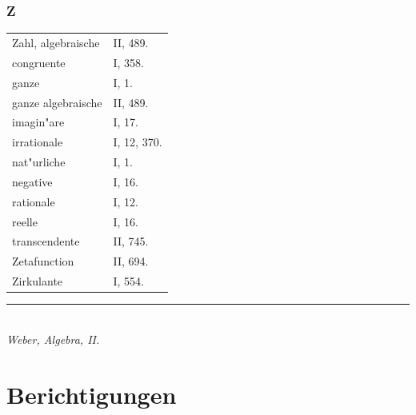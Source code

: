 \documentclass[10pt,a4paper]{article}
\theoremstyle{weberstyle}
\begin{document}
\section*{Z}
\begin{flushleft}
\begin{tabular}{@{}p{8cm}l@{}}
Zahl, algebraische & II, 489.\\
\quad congruente & I, 358.\\
\quad ganze & I, 1.\\
\quad ganze algebraische & II, 489.\\
\quad imagin"are & I, 17.\\
\quad irrationale & I, 12, 370.\\
\quad nat"urliche & I, 1.\\
\quad negative & I, 16.\\
\quad rationale & I, 12.\\
\quad reelle & I, 16.\\
\quad transcendente & II, 745.\\[4pt]
Zetafunction & II, 694.\\[4pt]
Zirkulante & I, 554.
\end{tabular}
\end{flushleft}

\vfill
\begin{center}
\rule{0.5\textwidth}{0.4pt}\\[6pt]
\textit{Weber, Algebra, II.}
\end{center}

\newpage

%
%
\part*{Berichtigungen}
\end{document}

